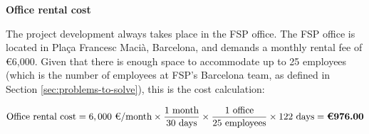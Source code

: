 \textbf{Office rental cost}
\vspace{-5pt}
 
The project development always takes place in the FSP office. The FSP office is located in Plaça Francesc Macià, Barcelona, and demands a monthly rental fee of €6,000. Given that there is enough space to accommodate up to 25 employees (which is the number of employees at FSP's Barcelona team, as defined in Section \ref{sec:problems-to-solve}), this is the cost calculation:

    
\vspace{-25pt}

\[
\text{Office rental cost} = 
6,000 \text{ €/month} \times 
\dfrac{1 \text{ month}}{30 \text{ days}} \times 
\dfrac{1 \text{ office}}{25 \text{ employees}} \times 
122 \text{ days} = 
\textbf{\text{€}976.00}
\]


\vspace{-5pt}


